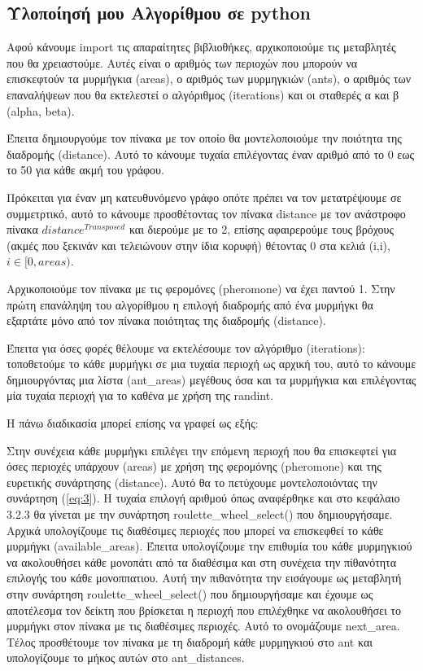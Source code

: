 \subsection{Υλοποίησή μου Αλγορίθμου σε python}

Αφού κάνουμε import τις απαραίτητες βιβλιοθήκες, αρχικοποιούμε τις μεταβλητές που θα χρειαστούμε. Αυτές είναι ο αριθμός των περιοχών που μπορούν να επισκεφτούν τα μυρμήγκια (areas), ο αριθμός των μυρμηγκιών (ants), ο αριθμός των επαναλήψεων που θα εκτελεστεί ο αλγόριθμος (iterations) και οι σταθερές α και β (alpha, beta).


Έπειτα δημιουργούμε τον πίνακα με τον οποίο θα μοντελοποιούμε την ποιότητα της διαδρομής (distance). Αυτό το κάνουμε τυχαία επιλέγοντας έναν αριθμό από το 0 εως το 50 για κάθε ακμή του γράφου.


Πρόκειται για έναν μη κατευθυνόμενο γράφο οπότε πρέπει να τον μετατρέψουμε σε συμμετρτικό, αυτό το κάνουμε προσθέτοντας τον πίνακα distance με τον ανάστροφο πίνακα $distance^{Transposed}$ και διερούμε με το 2, επίσης αφαιρερούμε τους βρόχους (ακμές που ξεκινάν και τελειώνουν στην ίδια κορυφή) θέτοντας 0 στα κελιά (i,i), $i\in[0,areas)$. \cite{Sanz}


Αρχικοποιούμε τον πίνακα με τις φερομόνες (pheromone) να έχει παντού 1. Στην πρώτη επανάληψη του αλγορίθμου η επιλογή διαδρομής από ένα μυρμήγκι θα εξαρτάτε μόνο από τον πίνακα ποιότητας της διαδρομής (distance). 


Έπειτα για όσες φορές θέλουμε να εκτελέσουμε τον αλγόριθμο (iterations):
τοποθετούμε το κάθε μυρμήγκι σε μια τυχαία περιοχή ως αρχική του, αυτό το κάνουμε δημιουργόντας μια λίστα (ant\_areas) μεγέθους όσα και τα μυρμήγκια και επιλέγοντας μία τυχαία περιοχή για το καθένα με χρήση της randint. \cite{w3school}

Η πάνω διαδικασία μπορεί επίσης να γραφεί ως εξής: 


Στην συνέχεια κάθε μυρμήγκι επιλέγει την επόμενη περιοχή που θα επισκεφτεί για όσες περιοχές υπάρχουν (areas) με χρήση της φερομόνης (pheromone) και της ευρετικής συνάρτησης (distance). Αυτό θα το πετύχουμε μοντελοποιόντας την συνάρτηση (\ref{eq:3}). Η τυχαία επιλογή αριθμού όπως αναφέρθηκε και στο κεφάλαιο 3.2.3 θα γίνεται με την συνάρτηση roulette\_wheel\_select() που δημιουργήσαμε. 
Αρχικά υπολογίζουμε τις διαθέσιμες περιοχές που μπορεί να επισκεφθεί το κάθε μυρμήγκι (available\_areas). Έπειτα υπολογίζουμε την επιθυμία του κάθε μυρμηγκιού να ακολουθήσει κάθε μονοπάτι από τα διαθέσιμα και στη συνέχεια την πίθανότητα επιλογής του κάθε μονοππατιου. Αυτή την πιθανότητα την εισάγουμε ως μεταβλητή στην συνάρτηση roulette\_wheel\_select() που δημιουργήσαμε και έχουμε ως αποτέλεσμα τον δείκτη που βρίσκεται η περιοχή που επιλέχθηκε να ακολουθήσει το μυρμήγκι στον πίνακα με τις διαθέσιμες περιοχές. Αυτό το ονομάζουμε next\_area. Τέλος προσθέτουμε τον πίνακα με τη διαδρομή κάθε μυρμηγκιού στο ant και υπολογίζουμε το μήκος αυτών στο ant\_distances. 


